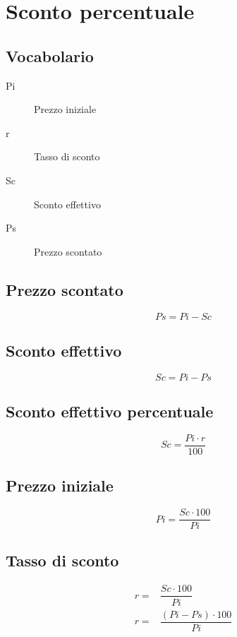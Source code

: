 
\chapter{Sconto percentuale}
\section{Vocabolario}
\begin{description}
	\item[Pi] Prezzo iniziale
	\item[r] Tasso di sconto
	\item[Sc] Sconto effettivo
	\item[Ps] Prezzo scontato
\end{description}\section{Prezzo scontato}
\begin{equation*}
Ps=Pi-Sc
\end{equation*}
\section{Sconto effettivo}
\begin{equation*}
Sc=Pi-Ps
\end{equation*}

\section{Sconto effettivo percentuale}
\begin{equation*}
Sc=\dfrac{Pi\cdot r}{100}
\end{equation*}
\section{Prezzo iniziale}
\begin{equation*}
Pi=\dfrac{Sc\cdot 100}{Pi}
\end{equation*}

\section{Tasso di sconto}
\begin{align*}
r=&\dfrac{Sc\cdot 100}{Pi}\\
r=&\dfrac{(Pi-Ps)\cdot 100}{Pi}
\end{align*}